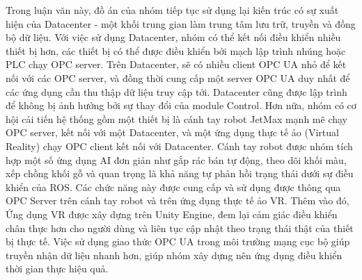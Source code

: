 Trong luận văn này, đồ án của nhóm tiếp tục sử dụng lại kiến trúc có sự xuất hiện của Datacenter - một khối trung gian làm trung tâm lưu trữ, truyền và đồng bộ dữ liệu. Với việc sử dụng Datacenter, nhóm có thể kết nối điều khiển nhiều thiết bị hơn, các thiết bị có thể được điều khiển bởi mạch lập trình nhúng hoặc PLC chạy OPC server. Trên Datacenter, sẽ có nhiều client OPC UA nhỏ để kết nối với các OPC server, và đồng thời cung cấp một server OPC UA duy nhất để các ứng dụng cần thu thập dữ liệu truy cập tới. Datacenter cũng được lập trình để không bị ảnh hưởng bởi sự thay đổi của module Control. Hơn nữa, nhóm có cơ hội cải tiến hệ thống gồm một thiết bị là cánh tay robot JetMax mạnh mẽ chạy OPC server, kết nối với một Datacenter, và một ứng dụng thực tế ảo (Virtual Reality) chạy OPC client kết nối với Datacenter. Cánh tay robot được nhóm tích hợp một số ứng dụng AI đơn giản như gắp rác bán tự động, theo dõi khối màu, xếp chồng khối gỗ và quan trọng là khả năng tự phản hồi trạng thái dưới sự điều khiển của ROS. Các chức năng này được cung cấp và sử dụng được thông qua OPC Server trên cánh tay robot và trên ứng dụng thực tế ảo VR. Thêm vào đó, Ứng dụng VR được xây dựng trên Unity Engine, đem lại cảm giác điều khiển chân thực hơn cho người dùng và liên tục cập nhật theo trạng thái thật của thiết bị thực tế. Việc sử dụng giao thức OPC UA trong môi trường mạng cục bộ giúp truyền nhận dữ liệu nhanh hơn, giúp nhóm xây dựng nên ứng dụng điều khiển thời gian thực hiệu quả. 


